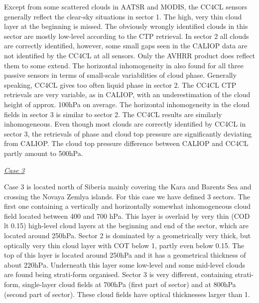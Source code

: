 {Except from some scattered clouds in AATSR and MODIS, the CC4CL sensors generally reflect the clear-sky situations in sector 1. The high, very thin cloud layer at the beginning is missed. The obviously wrongly identified clouds in this sector are mostly low-level according to the CTP retrieval. In sector 2 all clouds are correctly identified, however, some small gaps seen in the CALIOP data are not identified by the CC4CL at all sensors. Only the AVHRR product does reflect them to some extend. The horizontal inhomogeneity in also found for all three passive sensors in terms of small-scale variabilities of cloud phase. Generally speaking, CC4CL gives too often liquid phase in sector 2. The CC4CL CTP retrievals are very variable, as in CALIOP, with an underestimation of the cloud height of approx. 100hPa on average. The horizontal inhomogeneity in the cloud fields in sector 3 is similar to sector 2. The CC4CL results are similarly inhomogeneous. Even though most clouds are correctly identified by CC4CL in sector 3, the retrievals of phase and cloud top pressure are significantly deviating from CALIOP. The cloud top pressure difference between CALIOP and CC4CL partly amount to 500hPa.

\vspace{5mm}\underline{\textit{Case 3}}\vspace{2mm}

Case 3 is located north of Siberia mainly covering the Kara and Barents Sea and crossing the Novaya Zemlya islands. For this case we have defined 3 sectors. The first one containing a vertically and horizontally somewhat inhomogeneous cloud field located between 400 and 700 hPa. This layer is overlaid by very thin (COD lt 0.15) high-level cloud layers at the beginning and end of the sector, which are located around 250hPa. Sector 2 is dominated by a geometrically very thick, but optically very thin cloud layer with COT below 1, partly even below 0.15. The top of this layer is located around 250hPa and it has a geometrical thickness of about 220hPa. Underneath this layer some low-level and some mid-level clouds are found being strati-form organised. Sector 3 is very different, containing strati-form, single-layer cloud fields at 700hPa (first part of sector) and at 800hPa (second part of sector). These cloud fields have optical thicknesses larger than 1.

}
